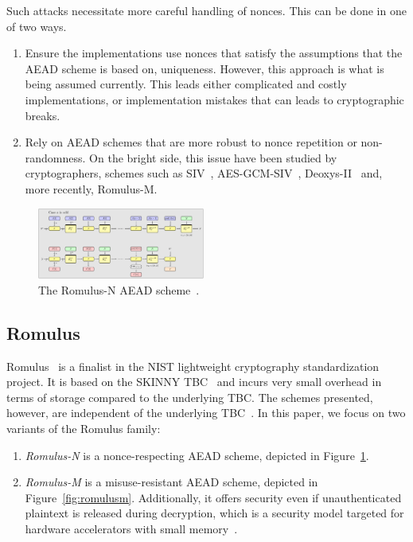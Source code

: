 \documentclass[conference]{IEEEtran}
\begin{document}
Such attacks necessitate more careful handling of nonces. This can be done in one of two ways.

\begin{enumerate}

\item Ensure the implementations use nonces that satisfy the assumptions that the AEAD scheme is based on, \eg uniqueness. However, this approach is what is being assumed currently. This leads either complicated and costly implementations, or implementation mistakes that can leads to cryptographic breaks.
\item Rely on AEAD schemes that are more robust to nonce repetition or non-randomness. On the bright side, this issue have been studied by cryptographers, schemes such as SIV~\cite{rogaway2006provable}, AES-GCM-SIV~\cite{gueron2017aes}, Deoxys-II~\cite{jean2016deoxys} and, more recently, Romulus-M.
\end{enumerate}

\begin{figure}[!t]
  \centering
  \includegraphics[width=0.49\textwidth]{figures/mode_simplified.pdf}
  \caption{The Romulus-N AEAD scheme~\cite{romulus_site}.}\label{fig:romulusn}
\end{figure}

\subsection{Romulus}

Romulus~\cite{iwataromulus} is a finalist in the NIST lightweight cryptography standardization project. It is based on the SKINNY TBC~\cite{beierle2016skinny} and incurs very small overhead in terms of storage compared to the underlying TBC. The schemes presented, however, are independent of the underlying TBC~\cite{iwata2020duel}. In this paper, we focus on two variants of the Romulus family:

\begin{enumerate}
\item {\it Romulus-N} is a nonce-respecting AEAD scheme, depicted in Figure~\ref{fig:romulusn}.
\item {\it Romulus-M} is a misuse-resistant AEAD scheme, depicted in Figure~\ref{fig:romulusm}. Additionally, it offers security even if unauthenticated plaintext is released during decryption, which is a security model targeted for hardware accelerators with small memory~\cite{andreeva2014securely}.
\end{enumerate}
\end{document}
